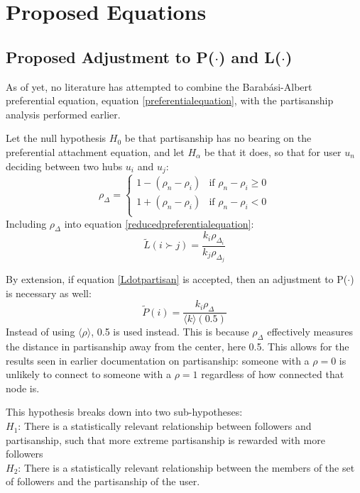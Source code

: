 \documentclass[NETN,manuscript]{stjour-new}
\begin{document}
\section{Proposed Equations}
\subsection{Proposed Adjustment to P($\cdot$) and L($\cdot$)}
As of yet, no literature has attempted to combine the Barab{\'a}si-Albert preferential equation, equation \ref{preferentialequation}, with the partisanship analysis performed earlier.

Let the null hypothesis $H_0$ be that partisanship has no bearing on the preferential attachment equation, and let $H_\alpha$ be that it does, so that for user $u_n$ deciding between two hubs $u_i$ and $u_j$:
\begin{equation}
 \rho_\Delta =
    \begin{cases}
      1 - (\rho_n-\rho_i) & \text{if $\rho_n-\rho_i \geq 0$}\\
      1 + (\rho_n-\rho_i) & \text{if $\rho_n-\rho_i < 0$}\\
    \end{cases}
\end{equation}
Including $\rho_\Delta$ into equation
\ref{reducedpreferentialequation}:
\begin{equation}
\label{Ldotpartisan}
        \tilde{L}(i \succ j)=\frac{k_i\rho_{\Delta_i}}{k_j\rho_{\Delta_j}}
\end{equation}

By extension, if equation \ref{Ldotpartisan} is accepted, then an adjustment to P($\cdot$) is necessary as well:
\begin{equation}
\label{Pdotpartisan}
        \tilde{P}(i)=\frac{k_i\rho_{\Delta}}{\langle k \rangle (0.5)}
\end{equation}
Instead of using $\langle \rho \rangle$, 0.5 is used instead. This is because $\rho_{\Delta}$ effectively measures the distance in partisanship away from the center, here 0.5. This allows for the results seen in earlier documentation on partisanship: someone with a $\rho = 0$ is unlikely to connect to someone with a $\rho = 1$ regardless of how connected that node is. 

This hypothesis breaks down into two sub-hypotheses: \\
\textbf{$H_1$}: There is a statistically relevant relationship between followers and partisanship, such that more extreme partisanship is rewarded with more followers \\
\textbf{$H_2$}: There is a statistically relevant relationship between the members of the set of followers and the partisanship of the user.
\end{document}
